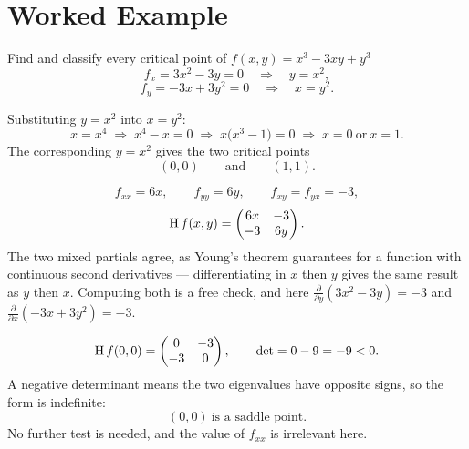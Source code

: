 \section{Worked Example}

\begin{worked}{Find and classify every critical point of $f(x,y)=x^{3}-3xy+y^{3}$}
\[
  f_{x}=3x^{2}-3y=0
  \quad\Longrightarrow\quad y=x^{2},
\]
\[
  f_{y}=-3x+3y^{2}=0
  \quad\Longrightarrow\quad x=y^{2} .
\]

Substituting $y=x^{2}$ into $x=y^{2}$:
\[
  x=x^{4}
  \;\Longrightarrow\;
  x^{4}-x=0
  \;\Longrightarrow\;
  x\bigl(x^{3}-1\bigr)=0
  \;\Longrightarrow\;
  x=0\ \text{or}\ x=1 .
\]
The corresponding $y=x^{2}$ gives the two critical points
\[
  (0,0)\qquad\text{and}\qquad(1,1).
\]

\[
  f_{xx}=6x,\qquad f_{yy}=6y,\qquad f_{xy}=f_{yx}=-3 ,
\]
\[
  \operatorname{H} f(x,y)=\begin{pmatrix}6x&-3\\-3&6y\end{pmatrix}.
\]
The two mixed partials agree, as Young's theorem guarantees for a function
with continuous second derivatives --- differentiating in $x$ then $y$ gives
the same result as $y$ then $x$. Computing both is a free check, and here
$\frac{\partial}{\partial y}(3x^{2}-3y)=-3$ and
$\frac{\partial}{\partial x}(-3x+3y^{2})=-3$. \checkmark

\[
  \operatorname{H} f(0,0)=\begin{pmatrix}0&-3\\-3&0\end{pmatrix},
  \qquad
  \det=0-9=-9<0 .
\]
A negative determinant means the two eigenvalues have opposite signs, so the
form is indefinite:
\[
  \boxed{(0,0)\ \text{is a saddle point.}}
\]
No further test is needed, and the value of $f_{xx}$ is irrelevant here.


\end{worked}
